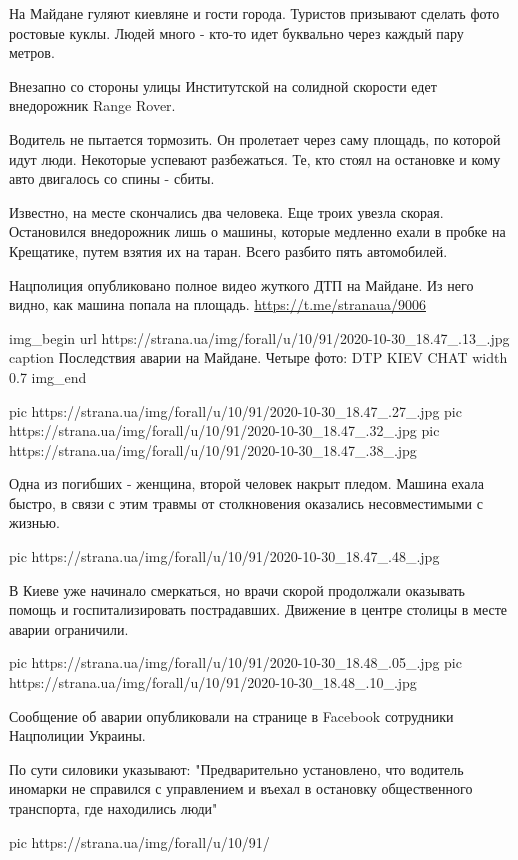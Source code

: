 На Майдане гуляют киевляне и гости города. Туристов призывают сделать фото
ростовые куклы. Людей много - кто-то идет буквально через каждый пару метров. 

Внезапно со стороны улицы Институтской на солидной скорости едет внедорожник
Range Rover.

Водитель не пытается тормозить. Он пролетает через саму площадь, по которой
идут люди. Некоторые успевают разбежаться. Те, кто стоял на остановке и кому
авто двигалось со спины - сбиты. 

Известно, на месте скончались два человека. Еще троих увезла скорая.
Остановился внедорожник лишь о машины, которые медленно ехали в пробке на
Крещатике, путем взятия их на таран. Всего разбито пять автомобилей. 

Нацполиция опубликовано полное видео жуткого ДТП на Майдане. Из него видно, как
машина попала на площадь.
\url{https://t.me/stranaua/9006}

\ifcmt
img_begin 
  url https://strana.ua/img/forall/u/10/91/2020-10-30_18.47_.13_.jpg
  caption Последствия аварии на Майдане. Четыре фото: DTP KIEV CHAT
  width 0.7
img_end
\fi

\ifcmt
pic https://strana.ua/img/forall/u/10/91/2020-10-30_18.47_.27_.jpg
pic https://strana.ua/img/forall/u/10/91/2020-10-30_18.47_.32_.jpg
pic https://strana.ua/img/forall/u/10/91/2020-10-30_18.47_.38_.jpg
\fi

Одна из погибших - женщина, второй человек накрыт пледом. Машина ехала быстро,
в связи с этим травмы от столкновения оказались несовместимыми с жизнью. 

\ifcmt
pic https://strana.ua/img/forall/u/10/91/2020-10-30_18.47_.48_.jpg
\fi

В Киеве уже начинало смеркаться, но врачи скорой продолжали оказывать помощь и
госпитализировать пострадавших. Движение в центре столицы в месте аварии
ограничили. 

\ifcmt
pic https://strana.ua/img/forall/u/10/91/2020-10-30_18.48_.05_.jpg
pic https://strana.ua/img/forall/u/10/91/2020-10-30_18.48_.10_.jpg
\fi

Сообщение об аварии опубликовали на странице в Facebook сотрудники Нацполиции
Украины.

По сути силовики указывают: "Предварительно установлено, что водитель иномарки
не справился с управлением и въехал в остановку общественного транспорта, где
находились люди"

\ifcmt
pic https://strana.ua/img/forall/u/10/91/%
\fi

